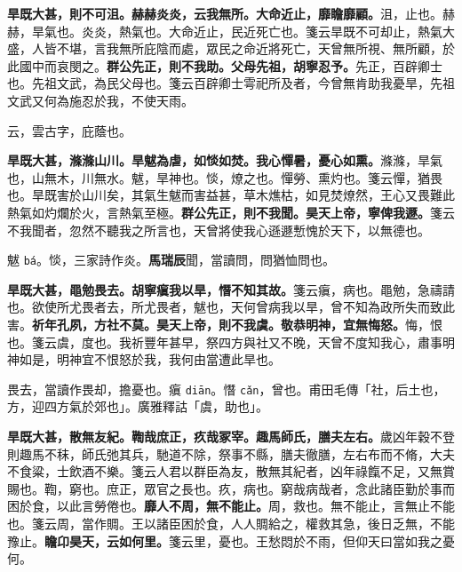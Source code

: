 \textbf{旱既大甚，則不可沮。赫赫炎炎，云我無所。大命近止，靡瞻靡顧。}{\footnotesize 沮，止也。赫赫，旱氣也。炎炎，熱氣也。大命近止，民近死亡也。箋云旱既不可却止，熱氣大盛，人皆不堪，言我無所庇陰而處，眾民之命近將死亡，天曾無所視、無所顧，於此國中而哀閔之。}\textbf{群公先正，則不我助。父母先祖，胡寧忍予。}{\footnotesize 先正，百辟卿士也。先祖文武，為民父母也。箋云百辟卿士雩祀所及者，今曾無肯助我憂旱，先祖文武又何為施忍於我，不使天雨。}

\begin{quoting}云，雲古字，庇蔭也。\end{quoting}

\textbf{旱既大甚，滌滌山川。旱魃為虐，如惔如焚。我心憚暑，憂心如熏。}{\footnotesize 滌滌，旱氣也，山無木，川無水。魃，旱神也。惔，燎之也。憚勞、熏灼也。箋云憚，猶畏也。旱既害於山川矣，其氣生魃而害益甚，草木燋枯，如見焚燎然，王心又畏難此熱氣如灼爛於火，言熱氣至極。}\textbf{群公先正，則不我聞。昊天上帝，寧俾我遯。}{\footnotesize 箋云不我聞者，忽然不聽我之所言也，天曾將使我心遜遯慙愧於天下，以無德也。}

\begin{quoting}魃 \texttt{bá}。惔，三家詩作炎。\textbf{馬瑞辰}聞，當讀問，問猶恤問也。\end{quoting}

\textbf{旱既大甚，黽勉畏去。胡寧瘨我以旱，憯不知其故。}{\footnotesize 箋云瘨，病也。黽勉，急禱請也。欲使所尤畏者去，所尤畏者，魃也，天何曾病我以旱，曾不知為政所失而致此害。}\textbf{祈年孔夙，方社不莫。昊天上帝，則不我虞。敬恭明神，宜無悔怒。}{\footnotesize 悔，恨也。箋云虞，度也。我祈豐年甚早，祭四方與社又不晚，天曾不度知我心，肅事明神如是，明神宜不恨怒於我，我何由當遭此旱也。}

\begin{quoting}畏去，當讀作畏却，擔憂也。瘨 \texttt{diān}。憯 \texttt{cǎn}，曾也。甫田毛傳「社，后土也，方，迎四方氣於郊也」。廣雅釋詁「虞，助也」。\end{quoting}

\textbf{旱既大甚，散無友紀。鞫哉庶正，疚哉冢宰。趣馬師氏，膳夫左右。}{\footnotesize 歲凶年穀不登則趣馬不秣，師氏弛其兵，馳道不除，祭事不縣，膳夫徹膳，左右布而不脩，大夫不食粱，士飲酒不樂。箋云人君以群臣為友，散無其紀者，凶年祿餼不足，又無賞賜也。鞫，窮也。庶正，眾官之長也。疚，病也。窮哉病哉者，念此諸臣勤於事而困於食，以此言勞倦也。}\textbf{靡人不周，無不能止。}{\footnotesize 周，救也。無不能止，言無止不能也。箋云周，當作賙。王以諸臣困於食，人人賙給之，權救其急，後日乏無，不能豫止。}\textbf{瞻卬昊天，云如何里。}{\footnotesize 箋云里，憂也。王愁悶於不雨，但仰天曰當如我之憂何。}

